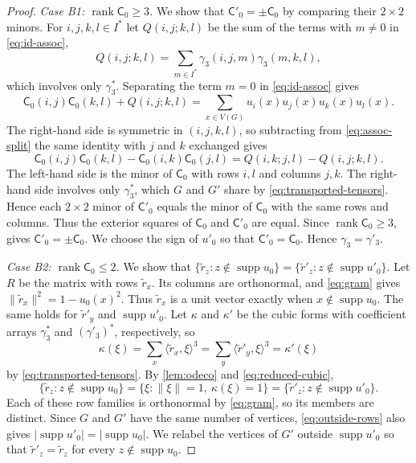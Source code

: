 \documentclass[11pt,a4paper]{article}
\theoremstyle{plain}
\theoremstyle{definition}
\DeclareMathOperator{\supp}{supp}
\DeclareMathOperator{\rank}{rank}
\begin{document}
\begin{proof}
  \emph{Case B1: $\rank \mathsf{C}_0 \geq 3$.} We show that
  $\mathsf C'_0=\pm\mathsf{C}_0$ by comparing their $2\times2$ minors.
  For $i,j,k,l \in I^{*}$ let $Q(i,j;k,l)$ be the sum of the terms with
  $m\neq0$ in \cref{eq:id-assoc},
  \begin{equation}\label{eq:q-tensor}
   Q(i,j;k,l) = \sum_{m \in I^{*}} \gamma_3(i,j,m) \gamma_3(m,k,l),
  \end{equation}
  which involves only $\gamma_3^*$.
  Separating the term $m=0$ in \cref{eq:id-assoc} gives
  \begin{equation}
    \label{eq:assoc-split}
    \mathsf{C}_0(i,j)\mathsf{C}_0(k,l)+Q(i,j;k,l)
    =\sum_{x \in V(G)} u_i(x) u_j(x) u_k(x) u_l(x).
  \end{equation}
  The right-hand side is symmetric in $(i,j,k,l)$, so subtracting from
  \cref{eq:assoc-split} the same identity with $j$ and $k$ exchanged
  gives
  \begin{equation}
    \label{eq:minors}
    \mathsf{C}_0(i,j) \mathsf{C}_0(k,l) - \mathsf{C}_0(i,k) \mathsf{C}_0(j,l) = Q(i,k;j,l) - Q(i,j;k,l).
  \end{equation}
  The left-hand side is the minor of $\mathsf{C}_0$ with rows $i,l$ and
  columns $j,k$. The right-hand side involves only $\gamma_3^*$,
  which $G$ and $G'$ share by \cref{eq:transported-tensors}. Hence each
  $2\times2$ minor of $\mathsf C'_0$ equals the minor of
  $\mathsf{C}_0$ with the same rows and columns.
  Thus the exterior squares of $\mathsf C_0$ and $\mathsf C'_0$ are equal.
  Since $\rank\mathsf C_0\geq3$, \cite[Corollary~4.1]{Greenhill1999}
  gives $\mathsf C'_0=\pm\mathsf C_0$.
  We choose the sign of $u'_0$ so that $\mathsf C'_0=\mathsf{C}_0$.
  Hence $\gamma_3=\gamma'_3$.

  \emph{Case B2: $\rank \mathsf{C}_0 \leq 2$.} We show that
  $\{\tilde{r}_z:z\notin\supp u_0\}=\{\tilde{r}'_z:z\notin\supp u'_0\}$.
  Let $R$ be the matrix with rows $\tilde{r}_x$. Its columns are
  orthonormal, and \cref{eq:gram} gives
  $\lVert\tilde{r}_x\rVert^2=1-u_0(x)^2$.
  Thus $\tilde{r}_x$ is a unit vector exactly when $x\notin\supp u_0$.
  The same holds for $\tilde{r}'_y$ and $\supp u'_0$.
  Let $\kappa$ and $\kappa'$ be the cubic forms with coefficient
  arrays $\gamma_3^*$ and $(\gamma'_3)^*$, respectively, so
  \begin{equation}\label{eq:reduced-cubic}
   \kappa(\xi)=\sum_x\langle\tilde{r}_x,\xi\rangle^3
   =\sum_y\langle\tilde{r}'_y,\xi\rangle^3=\kappa'(\xi)
  \end{equation}
  by \cref{eq:transported-tensors}.
  By \cref{lem:odeco} and \cref{eq:reduced-cubic},
  \begin{equation}\label{eq:outside-rows}
   \{\tilde{r}_z:z\notin\supp u_0\}
   =\{\xi:\lVert \xi\rVert=1,\ \kappa(\xi)=1\}
   =\{\tilde{r}'_z:z\notin\supp u'_0\}.
  \end{equation}
  Each of these row families is orthonormal by \cref{eq:gram}, so its
  members are distinct. Since $G$ and $G'$ have the same number of
  vertices, \cref{eq:outside-rows} also gives
  $|\supp u'_0|=|\supp u_0|$.
  We relabel the vertices of $G'$ outside $\supp u'_0$ so that
  $\tilde{r}'_z=\tilde{r}_z$ for every $z\notin\supp u_0$.


\end{proof}
\end{document}
